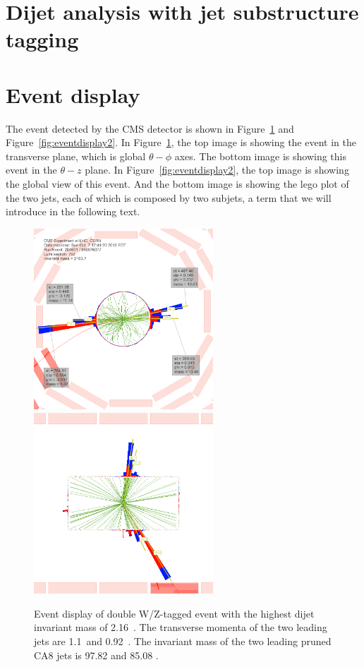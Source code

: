 \section{Dijet analysis with jet substructure tagging}
\label{sec:analysis}

\section{Event display}
The event detected by the CMS detector is shown in Figure~\ref{fig:eventdisplay1}
and Figure~\ref{fig:eventdisplay2}. In Figure~\ref{fig:eventdisplay1}, the top image is
showing the event in the transverse plane, which is global $\theta-\phi$ axes. The bottom
image is showing this event in the $\theta-z$ plane. In Figure~\ref{fig:eventdisplay2}, the top 
image is showing the global view of this event. And the bottom image is showing
the lego plot of the two jets, each of which is composed by two subjets, a term that we will
introduce in the following text.  

\begin{figure}[!htbp]
\begin{center}
\includegraphics[width=0.6\textwidth,angle=0]{EXO-12-024/figs/event-display/highdoublemass/rho-phi-white.png}
\includegraphics[width=0.6\textwidth,angle=0]{EXO-12-024/figs/event-display/highdoublemass/rho-z-white.png}
\end{center}
\caption{Event display of double W/Z-tagged event with the highest dijet invariant mass of 2.16~\TeVcc .
The transverse momenta of the two leading jets are 1.1~\TeVcc and 0.92~\TeVcc .
The invariant mass of the two leading pruned CA8 jets is 97.82 \GeVcc and 85.08 \GeVcc .
}
\label{fig:eventdisplay1}
\end{figure}

